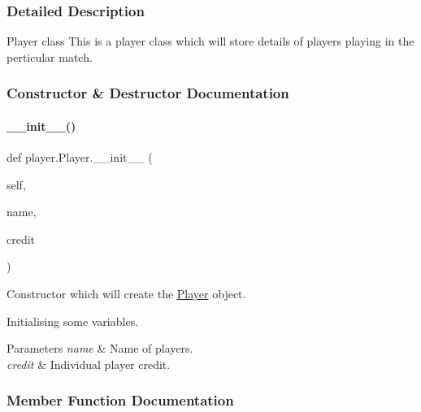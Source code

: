 \subsubsection{Detailed Description}
\begin{DoxyVerb}Player class
This is a player class which will store details of players playing in the perticular match.
\end{DoxyVerb}
 

\subsubsection{Constructor \& Destructor Documentation}
\mbox{\label{classplayer_1_1Player_a90d9d8f3076787182432ea5e311267cb}} 
\paragraph{\texorpdfstring{\+\_\+\+\_\+init\+\_\+\+\_\+()}{\_\_init\_\_()}}
{\footnotesize\ttfamily def player.\+Player.\+\_\+\+\_\+init\+\_\+\+\_\+ (\begin{DoxyParamCaption}\item[{}]{self,  }\item[{}]{name,  }\item[{}]{credit }\end{DoxyParamCaption})}



Constructor which will create the \hyperlink{classplayer_1_1Player}{Player} object. 

Initialising some variables. 
\begin{DoxyParams}{Parameters}
{\em name} & Name of players.\\
\hline
{\em credit} & Individual player credit. \\
\hline
\end{DoxyParams}


\subsubsection{Member Function Documentation}
\mbox{\label{classplayer_1_1Player_a1a0c66d49918caf21f07f2d69fe37868}} 
